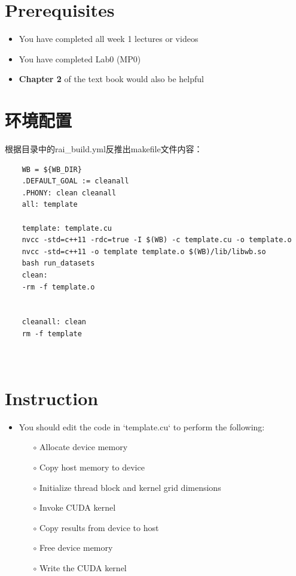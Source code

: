 \documentclass[11pt]{ctexart}
\begin{document}
\section{Prerequisites}
\begin{itemize}
	\item You have completed all week 1 lectures or videos
	\item You have completed Lab0 (MP0)
	\item \textbf{Chapter 2 }of the text book would also be helpful
\end{itemize}

\section{环境配置}
根据目录中的rai\_build.yml反推出makefile文件内容：

\begin{lstlisting}
	WB = ${WB_DIR}
	.DEFAULT_GOAL := cleanall
	.PHONY: clean cleanall
	all: template
	
	template: template.cu
	nvcc -std=c++11 -rdc=true -I $(WB) -c template.cu -o template.o
	nvcc -std=c++11 -o template template.o $(WB)/lib/libwb.so
	bash run_datasets
	clean:
	-rm -f template.o
	
	
	cleanall: clean
	rm -f template
	
	
\end{lstlisting}

\section{Instruction}
\begin{itemize}
	\item You should edit the code in `template.cu` to perform the following:
	\begin{itemize}
		\item[$\circ$] Allocate device memory
		\item[$\circ$] Copy host memory to device
		\item[$\circ$] Initialize thread block and kernel grid dimensions
		\item[$\circ$] Invoke CUDA kernel
		\item[$\circ$] Copy results from device to host
		\item[$\circ$] Free device memory
		\item[$\circ$]  Write the CUDA kernel
	\end{itemize}
\end{itemize}
\end{document}
